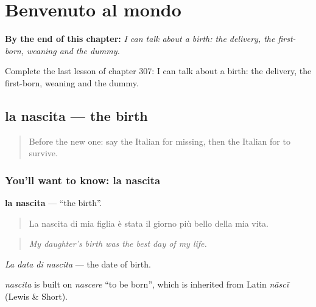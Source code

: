 
\chapter{Benvenuto al mondo}
\label{ch:it-benvenuto-al-mondo}

\begin{chapteropening}
\textbf{By the end of this chapter:} \emph{I can talk about a birth: the delivery, the first-born, weaning and the dummy.}

Complete the last lesson of chapter 307: I can talk about a birth: the delivery, the first-born, weaning and the dummy.
\end{chapteropening}

\section[la nascita]{la nascita — the birth}

\label{lesson:IT-C307-nascita}



\begin{quote}
Before the new one: say the Italian for missing, then the Italian for to survive.
\end{quote}

\subsection*{You'll want to know: la nascita}
\textbf{la nascita} — \textquotedblleft{}the birth\textquotedblright{}.

\begin{quote}
La nascita di mia figlia è stata il giorno più bello della mia vita.
\end{quote}

\begin{quote}
\emph{My daughter's birth was the best day of my life.}
\end{quote}

\emph{La data di nascita} — the date of birth.

\begin{cousinweb}
\emph{nascita} is built on \emph{nascere} \textquotedblleft{}to be born\textquotedblright{}, which is inherited from Latin \emph{nāscī} (Lewis \& Short).
\end{cousinweb}

